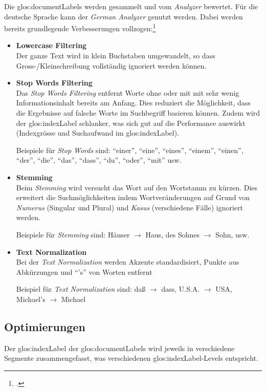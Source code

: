 Die \glspl{glos:documentLabel} werden gesammelt und vom \textit{Analyzer} bewertet. Für die deutsche Sprache kann der \textit{German Analyzer} genutzt werden.
Dabei werden bereits grundlegende Verbesserungen vollzogen:\footcite{Inner_workings_of_the_German_Analyzer_in_Lucene_2016-05-08}
\begin{itemize}
	\item \textbf{Lowercase Filtering}\\
	Der ganze Text wird in klein Buchstaben umgewandelt, so dass Gross-/Kleinschreibung vollständig ignoriert werden können.

	\item \textbf{Stop Words Filtering}\\
	Das \textit{Stop Words Filtering} entfernt Worte ohne oder mit mit sehr wenig Informationsinhalt bereits am Anfang.
	Dies reduziert die Möglichkeit, dass die Ergebnisse auf falsche Worte im Suchbegriff basieren können.
	Zudem wird der \gls{glos:indexLabel} schlanker, was sich gut auf die Performance auswirkt (Indexgrösse und Suchaufwand im \gls{glos:indexLabel}).

	Beispiele für \textit{Stop Words} sind:
	"`einer"', "`eine"', "`eines"', "`einem"', "`einen"', "`der"', "`die"', "`das"', "`dass"', "`du"', "`oder"', "`mit"' usw.

	\item \textbf{Stemming}\\
	Beim \textit{Stemming} wird versucht das Wort auf den Wortstamm zu kürzen.
	Dies erweitert die Suchmöglichkeiten indem Wortveränderungen auf Grund von \textit{Numerus} (Singular und Plural) und \textit{Kasus} (verschiedene Fälle) ignoriert werden.

	Beispiele für \textit{Stemming} sind:
	Häuser $\rightarrow$ Haus, des Sohnes $\rightarrow$ Sohn, usw.

	\item \textbf{Text Normalization}\\
	Bei der \textit{Text Normalization} werden Akzente standardisiert, Punkte aus Abkürzungen und "`'s"' von Worten entfernt

	Beispiel für \textit{Text Normalization} sind:
	daß $\rightarrow$ dass, U.S.A. $\rightarrow$ USA, Michael's $\rightarrow$ Michael

\end{itemize}


\subsection{Optimierungen}
Der \gls{glos:indexLabel} der \glspl{glos:documentLabel} wird jeweils in verschiedene Segmente zusammengefasst, was verschiedenen \gls{glos:indexLabel}-Levels entspricht.

